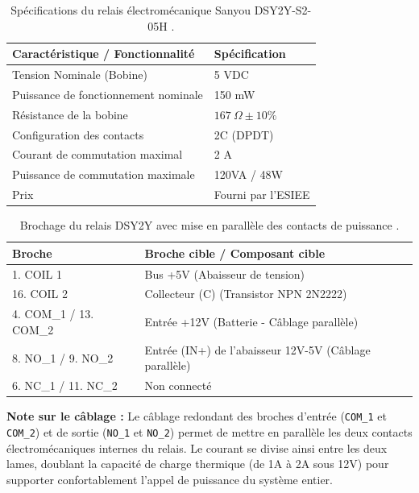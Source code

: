 \begin{table}[H]
    \centering
    \begin{tabular}{|p{6cm}|p{8cm}|}
        \hline
        \textbf{Caractéristique / Fonctionnalité} & \textbf{Spécification} \\
        \hline
        Tension Nominale (Bobine) & 5 VDC \\
        \hline
        Puissance de fonctionnement nominale & 150 mW \\
        \hline
        Résistance de la bobine & $167\ \Omega \pm 10\%$ \\
        \hline
        Configuration des contacts & 2C (DPDT) \\
        \hline
        Courant de commutation maximal & 2 A \\
        \hline
        Puissance de commutation maximale & 120VA / 48W \\
        \hline
        Prix & Fourni par l'ESIEE \\
        \hline
    \end{tabular}
    \caption{Spécifications du relais électromécanique Sanyou DSY2Y-S2-05H \cite{DSY2Y_Series}.}
    \label{tab:specs_relais}
\end{table}

\begin{table}[H]
    \centering
    \begin{tabular}{|l|l|}
        \hline
        \textbf{Broche} & \textbf{Broche cible / Composant cible} \\
        \hline
        1. COIL 1 & Bus +5V (Abaisseur de tension) \\
        \hline
        16. COIL 2 & Collecteur (C) (Transistor NPN 2N2222) \\
        \hline
        4. COM\_1 / 13. COM\_2 & Entrée +12V (Batterie - Câblage parallèle) \\
        \hline
        8. NO\_1 / 9. NO\_2 & Entrée (IN+) de l'abaisseur 12V-5V (Câblage parallèle) \\
        \hline
        6. NC\_1 / 11. NC\_2 & Non connecté \\
        \hline
    \end{tabular}
    \caption{Brochage du relais DSY2Y avec mise en parallèle des contacts de puissance \cite{DSY2Y_Series}.}
    \label{tab:pinout_relais}
\end{table}

\textbf{Note sur le câblage :} Le câblage redondant des broches d'entrée (\texttt{COM\_1} et \texttt{COM\_2}) et de sortie (\texttt{NO\_1} et \texttt{NO\_2}) permet de mettre en parallèle les deux contacts électromécaniques internes du relais. Le courant se divise ainsi entre les deux lames, doublant la capacité de charge thermique (de 1A à 2A sous 12V) pour supporter confortablement l'appel de puissance du système entier.

